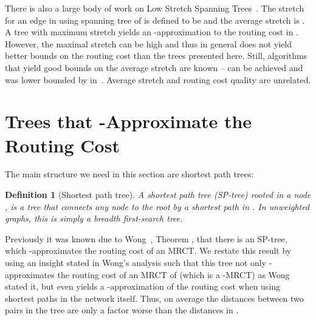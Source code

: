 \documentclass[11pt]{article}
\newtheorem{definition}[theorem]{Definition}
\begin{document}
There is also a large body of work on Low Stretch Spanning Trees~\cite{DBLP:conf/focs/AbrahamBN08,elkin2008low,peleg2002low}. The stretch for an edge  in  using spanning tree  of  is defined to be  and the average stretch is . A tree with maximum stretch  yields an -approximation to the routing cost in . However, the maximal stretch can be high and thus in general does not yield better bounds on the routing cost than the trees presented here. Still, algorithms that yield good bounds on the average stretch are known --  can be achieved and was lower bounded by  in~\cite{elkin2008low}. Average stretch and routing cost quality are unrelated.






\section{Trees that -Approximate the Routing Cost}\label{sec:det-ana}
The main structure we need in this section are shortest path trees:
\begin{definition}[Shortest path tree]
A shortest path tree (SP-tree) rooted in a node , is a tree that connects any node  to the root  by a shortest path in . In unweighted graphs, this is simply a breadth first-search tree.
\end{definition}
Previously it was known due to Wong~\cite{wong1980worst}, Theorem , that there is an SP-tree, which -approximates the routing cost of an MRCT. We restate this result by using an insight stated in Wong's analysis such that this tree not only -approximates the routing cost  of an MRCT  of  (which is a -MRCT) as Wong stated it, but even yields a -approximation of the routing cost  when using shortest paths in the network  itself. Thus, on average the distances between two pairs in the tree are only a factor  worse than the distances in . 
\end{document}
